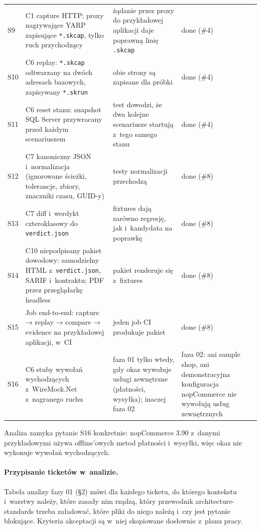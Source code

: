 {\begin{xltabular}{\linewidth}{@{}l >{\raggedright\arraybackslash}X >{\raggedright\arraybackslash}p{4.2cm} >{\raggedright\arraybackslash}p{2.2cm}@{}}
S9 & C1 capture HTTP: proxy nagrywające YARP zapisujące \texttt{*.skcap}, tylko ruch
przychodzący & żądanie przez proxy do przykładowej aplikacji daje poprawną linię
\texttt{.skcap} & done (\#4) \\
S10 & C6 replay: \texttt{*.skcap} odtwarzany na dwóch adresach bazowych, zapisywany
\texttt{*.skrun} & obie strony są zapisane dla próbki & done (\#4) \\
S11 & C6 reset stanu: snapshot SQL Server przywracany przed każdym scenariuszem & test
dowodzi, że dwa kolejne scenariusze startują z~tego samego stanu & done (\#4) \\
S12 & C7 kanoniczny JSON i~normalizacja (ignorowane ścieżki, tolerancje, zbiory, znaczniki
czasu, GUID-y) & testy normalizacji przechodzą & done (\#8) \\
S13 & C7 diff i~werdykt czteroklasowy do \texttt{verdict.json} & fixtures dają zarówno
regresję, jak i~kandydata na poprawkę & done (\#8) \\
S14 & C10 niepodpisany pakiet dowodowy: samodzielny HTML z~\texttt{verdict.json}, SARIF i~kontraktu; PDF przez przeglądarkę headless & pakiet renderuje się z~fixtures & done (\#8) \\
S15 & Job end-to-end: capture → replay → compare → evidence na przykładowej aplikacji, w~CI
& jeden job CI produkuje pakiet & done (\#8) \\
S16 & C6 stuby wywołań wychodzących z~WireMock.Net z~nagranego ruchu & faza 01 tylko wtedy,
gdy okaz wywołuje usługi zewnętrzne (płatności, wysyłka); inaczej faza 02 & faza 02: ani
sample shop, ani demonstracyjna konfiguracja nopCommerce nie wywołują usług zewnętrznych \\
\end{xltabular}
}

Analiza zamyka pytanie S16 konkretnie: nopCommerce 3.90 z~danymi przykładowymi używa
offline'owych metod płatności i~wysyłki, więc okaz nie wykonuje wywołań wychodzących.

\paragraph{Przypisanie ticketów w~analizie.} Tabela analizy fazy 01 (§2) mówi dla każdego
ticketu, do którego kontekstu i~warstwy należy, które zasady nim rządzą, który przewodnik
architecture-standards trzeba załadować, które pliki do niego należą i~czy jest pytanie
blokujące. Kryteria akceptacji są w~niej skopiowane dosłownie z~planu pracy.

